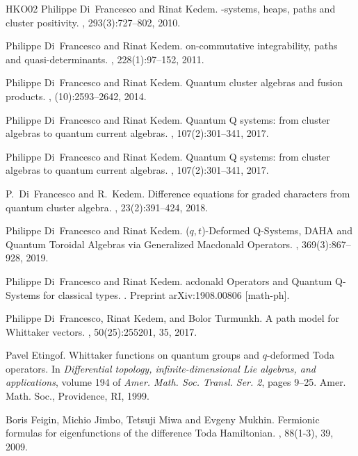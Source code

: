 \documentclass[12pt]{amsart}
\numberwithin{equation}{section}
\begin{document}
\begin{thebibliography}{HKO{\etalchar{+}}02}
Philippe Di~Francesco and Rinat Kedem.
-systems, heaps, paths and cluster positivity.
, 293(3):727--802, 2010.

Philippe Di~Francesco and Rinat Kedem.
on-commutative integrability, paths and quasi-determinants.
, 228(1):97--152, 2011.

Philippe Di~Francesco and Rinat Kedem.
\newblock Quantum cluster algebras and fusion products.
, (10):2593--2642, 2014.

Philippe Di~Francesco and Rinat Kedem.
\newblock Quantum {Q} systems: from cluster algebras to quantum current
  algebras.
, 107(2):301--341, 2017.

Philippe Di~Francesco and Rinat Kedem.
\newblock Quantum {Q} systems: from cluster algebras to quantum current
  algebras.
, 107(2):301--341, 2017.

P.~Di~Francesco and R.~Kedem.
\newblock Difference equations for graded characters from quantum cluster
  algebra.
, 23(2):391--424, 2018.

Philippe Di~Francesco and Rinat Kedem.
\newblock ($q,t$)-{D}eformed {Q}-{S}ystems, {DAHA} and {Q}uantum {T}oroidal
  {A}lgebras via {G}eneralized {M}acdonald {O}perators.
, 369(3):867--928, 2019.

Philippe Di~Francesco and Rinat Kedem.
acdonald {O}perators and {Q}uantum {Q}-{S}ystems for classical
  types.
.
\newblock Preprint arXiv:1908.00806 [math-ph].

Philippe Di~Francesco, Rinat Kedem, and Bolor Turmunkh.
\newblock A path model for {W}hittaker vectors.
, 50(25):255201, 35, 2017.

Pavel Etingof.
\newblock Whittaker functions on quantum groups and {$q$}-deformed {T}oda
  operators.
\newblock In {\em Differential topology, infinite-dimensional {L}ie algebras,
  and applications}, volume 194 of {\em Amer. Math. Soc. Transl. Ser. 2}, pages
  9--25. Amer. Math. Soc., Providence, RI, 1999.
  
Boris Feigin, Michio Jimbo, Tetsuji Miwa and Evgeny Mukhin.
\newblock Fermionic formulas for eigenfunctions of the difference {T}oda
{H}amiltonian.
, 88(1-3), 39, 2009.



\end{thebibliography}
\end{document}
